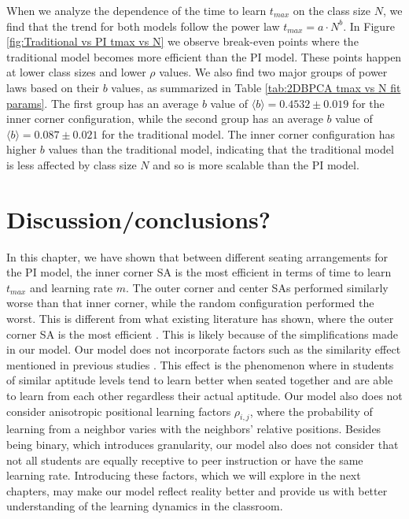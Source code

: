 When we analyze the dependence of the time to learn $t_{max}$ on the class size $N$, we find that the trend for both models follow the power law $t_{max} = a \cdot N^b$. In Figure \ref{fig:Traditional vs PI tmax vs N} we observe break-even points where the traditional model becomes more efficient than the PI model. These points happen at lower class sizes and lower $\rho$ values. We also find two major groups of power laws based on their $b$ values, as summarized in Table \ref{tab:2DBPCA tmax vs N fit params}. The first group has an average $b$ value of $\langle b \rangle = 0.4532 \pm 0.019$ for the inner corner configuration, while the second group has an average $b$ value of $\langle b \rangle = 0.087\pm0.021$ for the traditional model. The inner corner configuration has higher $b$ values than the traditional model, indicating that the traditional model is less affected by class size $N$ and so is more scalable than the PI model.

\section{Discussion/conclusions?}
In this chapter, we have shown that between different seating arrangements for the PI model, the inner corner SA is the most efficient in terms of time to learn $t_{max}$ and learning rate $m$. The outer corner and center SAs performed similarly worse than that inner corner, while the random configuration performed the worst. This is different from what existing literature has shown, where the outer corner SA is the most efficient \cite{roxas2010seating}. This is likely because of the simplifications made in our model. Our model does not incorporate factors such as the similarity effect mentioned in previous studies \cite{roxas2010seating,smith2009peer}. This effect is the phenomenon where in students of similar aptitude levels tend to learn better when seated together and are able to learn from each other regardless their actual aptitude. Our model also does not consider anisotropic positional learning factors $\rho_{i,j}$, where the probability of learning from a neighbor varies with the neighbors' relative positions. Besides being binary, which introduces granularity, our model also does not consider that not all students are equally receptive to peer instruction or have the same learning rate. Introducing these factors, which we will explore in the next chapters, may make our model reflect reality better and provide us with better understanding of the learning dynamics in the classroom.

